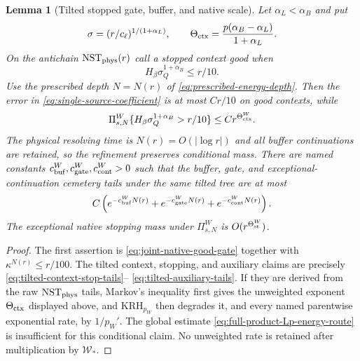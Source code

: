 \documentclass[11pt]{article}
\newtheorem{lemma}[theorem]{Lemma}
\begin{document}
\begin{lemma}[Tilted stopped gate, buffer, and native scale]
\label{lem:gate-buffer}
Let $\alpha_L<\alpha_B$ and put
\begin{equation}
\label{eq:native-energy-scale}
 \sigma=(r/c_\ell)^{1/(1+\alpha_L)},\qquad
 \Theta_{\rm ctx}=\frac{p(\alpha_B-\alpha_L)}{1+\alpha_L}.
\end{equation}
On the antichain $\mathrm{NST}_{\rm phys}(r)$ call a stopped context good
when
\begin{equation}
\label{eq:joint-native-good-gate}
 H_\beta\sigma_Q^{1+\alpha_B}\le r/10.
\end{equation}
Use the prescribed depth $N=N(r)$ of
\eqref{eq:prescribed-energy-depth}.  Then the error in
\eqref{eq:single-source-coefficient} is at most $Cr/10$ on good contexts,
while
\begin{equation}
\label{eq:bad-context-native-scale}
 \Pi_{s,N}^{W}
 \{H_\beta\sigma_Q^{1+\alpha_B}>r/10\}
 \le Cr^{\Theta_{\rm ctx}^{W}}.
\end{equation}
The physical resolving time is $N(r)=O(|\log r|)$ and all buffer
continuations are retained, so the refinement preserves conditional mass.
There are named constants
$c_{\rm buf}^{W},c_{\rm gate}^{W},c_{\rm cont}^{W}>0$ such that the
buffer, gate, and exceptional-continuation cemetery tails under the same
tilted tree are at most
\begin{equation}
\label{eq:named-energy-tails}
 C\left(e^{-c_{\rm buf}^{W}N(r)}+e^{-c_{\rm gate}^{W}N(r)}
 +e^{-c_{\rm cont}^{W}N(r)}\right).
\end{equation}
The exceptional native stopping mass under $\Pi_{s,N}^{W}$ is
$O(r^{\Theta_{\rm st}^{W}})$.
\end{lemma}

\begin{proof}
The first assertion is \eqref{eq:joint-native-good-gate} together with
$\kappa^{N(r)}\le r/100$.  The tilted context, stopping, and auxiliary
claims are precisely
\eqref{eq:tilted-context-stop-tails}--
\eqref{eq:tilted-auxiliary-tails}.  If they are derived from the raw
$\mathrm{NST}_{\rm phys}$ tails, Markov's inequality first gives the
unweighted exponent $\Theta_{\rm ctx}$ displayed above, and
$\mathrm{KRH}_{p_W}$ then degrades it, and every named parentwise
exponential rate, by $1/p_W'$.  The global estimate
\eqref{eq:full-product-Lp-energy-route} is insufficient for this conditional
claim.  No unweighted rate is retained after multiplication by
$\mathscr W_*$.
\end{proof}
\end{document}
